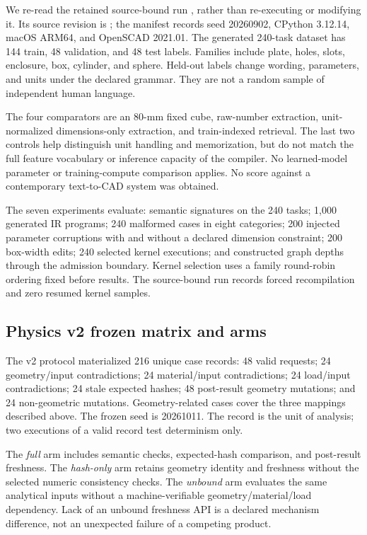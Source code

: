 \documentclass[10pt]{article}
\newcommand{\code}[1]{\texttt{\detokenize{#1}}}
\begin{document}
We re-read the retained source-bound run \code{NC-REPRO-508EC40}, rather than
re-executing or modifying it. Its source revision is
; the manifest records seed
20260902, CPython 3.12.14, macOS ARM64, and OpenSCAD 2021.01. The generated
240-task dataset has 144 train, 48 validation, and 48 test labels. Families
include plate, holes, slots, enclosure, box, cylinder, and sphere. Held-out
labels change wording, parameters, and units under the declared grammar.
They are not a random sample of independent human language.

The four comparators are an 80-mm fixed cube, raw-number extraction,
unit-normalized dimensions-only extraction, and train-indexed retrieval.
The last two controls help distinguish unit handling and memorization, but
do not match the full feature vocabulary or inference capacity of the
compiler. No learned-model parameter or training-compute comparison applies.
No score against a contemporary text-to-CAD system was obtained.

The seven experiments evaluate: semantic signatures on the 240 tasks;
1,000 generated IR programs; 240 malformed cases in eight categories;
200 injected parameter corruptions with and without a declared dimension
constraint; 200 box-width edits; 240 selected kernel executions; and
constructed graph depths through the admission boundary. Kernel selection
uses a family round-robin ordering fixed before results. The source-bound
run records forced recompilation and zero resumed kernel samples.

\subsection{Physics v2 frozen matrix and arms}

The v2 protocol materialized 216 unique case records: 48 valid requests;
24 geometry/input contradictions; 24 material/input contradictions;
24 load/input contradictions; 24 stale expected hashes; 48 post-result
geometry mutations; and 24 non-geometric mutations. Geometry-related cases
cover the three mappings described above. The frozen seed is 20261011.
The record is the unit of analysis; two executions of a valid record test
determinism only.

The \emph{full} arm includes semantic checks, expected-hash comparison, and
post-result freshness. The \emph{hash-only} arm retains geometry identity
and freshness without the selected numeric consistency checks. The
\emph{unbound} arm evaluates the same analytical inputs without a
machine-verifiable geometry/material/load dependency. Lack of an unbound
freshness API is a declared mechanism difference, not an unexpected failure
of a competing product.
\end{document}

